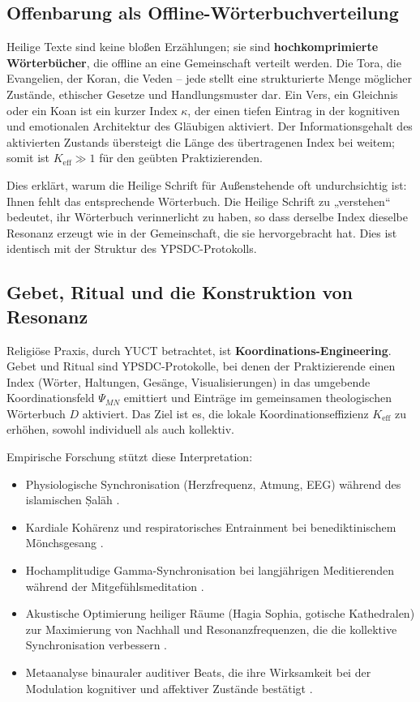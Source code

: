 \documentclass[12pt,a4paper]{article}
\begin{document}
	\subsection{Offenbarung als Offline-Wörterbuchverteilung}
	
	Heilige Texte sind keine bloßen Erzählungen; sie sind \textbf{hochkomprimierte Wörterbücher}, die offline an eine Gemeinschaft verteilt werden. Die Tora, die Evangelien, der Koran, die Veden – jede stellt eine strukturierte Menge möglicher Zustände, ethischer Gesetze und Handlungsmuster dar. Ein Vers, ein Gleichnis oder ein Koan ist ein kurzer Index \(\kappa\), der einen tiefen Eintrag in der kognitiven und emotionalen Architektur des Gläubigen aktiviert. Der Informationsgehalt des aktivierten Zustands übersteigt die Länge des übertragenen Index bei weitem; somit ist \(K_{\mathrm{eff}} \gg 1\) für den geübten Praktizierenden.
	
	Dies erklärt, warum die Heilige Schrift für Außenstehende oft undurchsichtig ist: Ihnen fehlt das entsprechende Wörterbuch. Die Heilige Schrift zu „verstehen“ bedeutet, ihr Wörterbuch verinnerlicht zu haben, so dass derselbe Index dieselbe Resonanz erzeugt wie in der Gemeinschaft, die sie hervorgebracht hat. Dies ist identisch mit der Struktur des YPSDC-Protokolls.
	
	\subsection{Gebet, Ritual und die Konstruktion von Resonanz}
	
	Religiöse Praxis, durch YUCT betrachtet, ist \textbf{Koordinations-Engineering}. Gebet und Ritual sind YPSDC-Protokolle, bei denen der Praktizierende einen Index (Wörter, Haltungen, Gesänge, Visualisierungen) in das umgebende Koordinationsfeld \(\Psi_{MN}\) emittiert und Einträge im gemeinsamen theologischen Wörterbuch \(D\) aktiviert. Das Ziel ist es, die lokale Koordinationseffizienz \(K_{\mathrm{eff}}\) zu erhöhen, sowohl individuell als auch kollektiv.
	
	Empirische Forschung stützt diese Interpretation:
	\begin{itemize}[leftmargin=*]
		\item Physiologische Synchronisation (Herzfrequenz, Atmung, EEG) während des islamischen Ṣalāh \cite{RoyalSociety2024}.
		\item Kardiale Kohärenz und respiratorisches Entrainment bei benediktinischem Mönchsgesang \cite{Craswell2023}.
		\item Hochamplitudige Gamma-Synchronisation bei langjährigen Meditierenden während der Mitgefühlsmeditation \cite{Lutz2017}.
		\item Akustische Optimierung heiliger Räume (Hagia Sophia, gotische Kathedralen) zur Maximierung von Nachhall und Resonanzfrequenzen, die die kollektive Synchronisation verbessern \cite{Pentcheva2020}.
		\item Metaanalyse binauraler auditiver Beats, die ihre Wirksamkeit bei der Modulation kognitiver und affektiver Zustände bestätigt \cite{Garcia2021}.
	\end{itemize}
	
\end{document}
